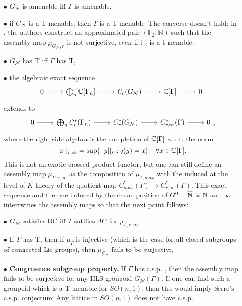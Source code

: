 \begin{itemize}
\item[$\bullet$] $G_{\mathcal N}$ is amenable iff $\Gamma$ is amenable,\\

\item[$\bullet$] if $G_{\mathcal N}$ is a-T-menable, then $\Gamma$ is a-T-menable. The converse doesn't hold: in \cite{HLS}, the authors construct an approximated pair $(\mathbb F_2, \mathbb N)$ such that the assembly map $\mu_{G_{\mathcal N},r }$ is not surjective, even if $\mathbb F_2$ is a-t-menable. \\

\item[$\bullet$] $G_{\mathcal N}$ has T iff $\Gamma$ has T,\\

\item[$\bullet$] the algebraic exact sequence
\[\begin{tikzcd}0 \arrow{r} & \bigoplus_n \C[\Gamma_n] \arrow{r} & C_c(G_{\mathcal N})\arrow{r} &  \C [\Gamma]\arrow{r} & 0 \end{tikzcd}\]
extends to 
\[\begin{tikzcd}0 \arrow{r} & \bigoplus_n C^*_{r}(\Gamma_n) \arrow{r} & C^*_r(G_{\mathcal N})\arrow{r} &  C^*_{r,\infty}(\Gamma)\arrow{r} & 0 \end{tikzcd},\]
where the right side algebra is the completion of $\mathbb C[\Gamma]$ w.r.t. the norm 
\[ ||x||_{r,\infty} = \sup \{ ||y ||_r : q(y)=x\} \quad \forall x \in \mathbb C [\Gamma].\]
This is not an exotic crossed product functor, but one can still define an assembly map $\mu_{\Gamma, r, \infty}$ as the composition of $\mu_{\Gamma,max}$ with the induced at the level of $K$-theory of the quotient map $C_{max}^*(\Gamma) \rightarrow C_{r,\infty}^*(\Gamma) $. This exact sequence and the one induced by the decomposition of $G^0 = \overline {\mathbb N}$ is $\mathbb N$ and $\infty$ intertwines the assembly maps so that the next point follows:\\

\item[$\bullet$] $G_{\mathcal N}$ satisfies BC iff $\Gamma$ satifies BC for $\mu_{\Gamma,r,\infty}$.\\

\item[$\bullet$] If $\Gamma$ has T, then if $\mu_\Gamma$ is injective (which is the case for all closed subgroups of connected Lie groups), then $\mu_{\mathcal G_{\mathcal N}}$ fails to be surjective.\\

\item[$\bullet$] \textbf{Congruence subgroup property.} If $\Gamma$ has c.s.p. , then the assembly map fails to be surjective for any HLS groupoid $G_{\mathcal N}(\Gamma)$. If one can find such a groupoid which is a-T-menable for $SO(n,1)$, then this would imply Serre's c.s.p. conjecture: Any lattice in $SO(n,1)$ does not have c.s.p.\\
\end{itemize}

